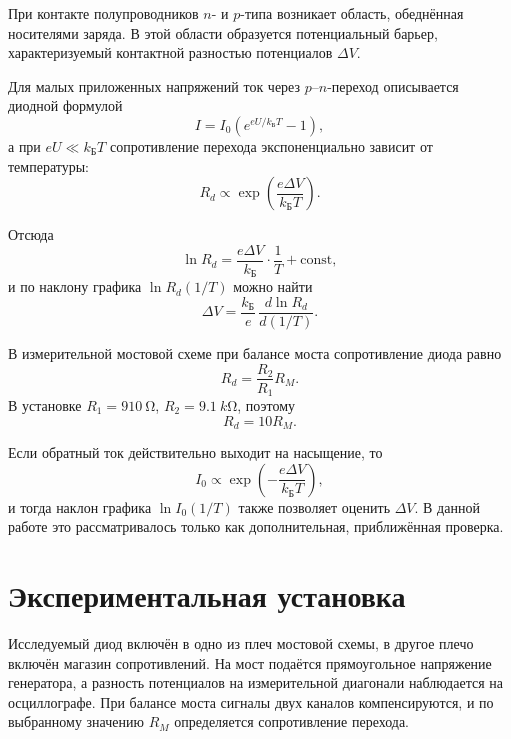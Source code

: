 \documentclass[a4paper,12pt]{article}
\begin{document}
При контакте полупроводников $n$- и $p$-типа возникает область, обеднённая носителями заряда. В этой области образуется потенциальный барьер, характеризуемый контактной разностью потенциалов $\Delta V$.

Для малых приложенных напряжений ток через $p$--$n$-переход описывается диодной формулой
\begin{equation}
    I = I_0 \left( e^{eU/k_{\text{Б}}T} - 1 \right),
\end{equation}
а при $eU \ll k_{\text{Б}}T$ сопротивление перехода экспоненциально зависит от температуры:
\begin{equation}
    R_d \propto \exp \left( \frac{e \Delta V}{k_{\text{Б}} T} \right).
\end{equation}

Отсюда
\begin{equation}
    \ln R_d = \frac{e \Delta V}{k_{\text{Б}}} \cdot \frac{1}{T} + \text{const},
\end{equation}
и по наклону графика $\ln R_d(1/T)$ можно найти
\begin{equation}
    \Delta V = \frac{k_{\text{Б}}}{e} \, \frac{d \ln R_d}{d(1/T)}.
    \label{eq:deltaV}
\end{equation}

В измерительной мостовой схеме при балансе моста сопротивление диода равно
\begin{equation}
    R_d = \frac{R_2}{R_1} R_M.
\end{equation}
В установке $R_1 = \SI{910}{\ohm}$, $R_2 = \SI{9.1}{k\ohm}$, поэтому
\begin{equation}
    R_d = 10 R_M.
\end{equation}

Если обратный ток действительно выходит на насыщение, то
\begin{equation}
    I_0 \propto \exp \left( -\frac{e \Delta V}{k_{\text{Б}} T} \right),
\end{equation}
и тогда наклон графика $\ln I_0(1/T)$ также позволяет оценить $\Delta V$. В данной работе это рассматривалось только как дополнительная, приближённая проверка.

\section{Экспериментальная установка}

Исследуемый диод включён в одно из плеч мостовой схемы, в другое плечо включён магазин сопротивлений. На мост подаётся прямоугольное напряжение генератора, а разность потенциалов на измерительной диагонали наблюдается на осциллографе. При балансе моста сигналы двух каналов компенсируются, и по выбранному значению $R_M$ определяется сопротивление перехода.
\end{document}
